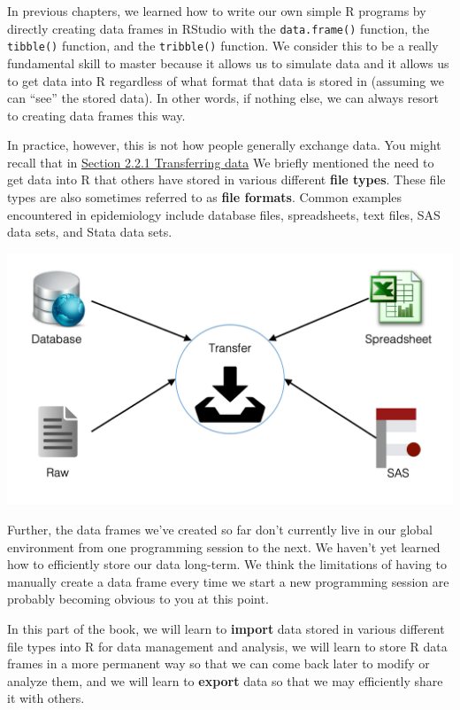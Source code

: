 \documentclass[
  letterpaper,
  DIV=11,
  numbers=noendperiod]{scrreprt}
\begin{document}
In previous chapters, we learned how to write our own simple R programs
by directly creating data frames in RStudio with the
\texttt{data.frame()} function, the \texttt{tibble()} function, and the
\texttt{tribble()} function. We consider this to be a really fundamental
skill to master because it allows us to simulate data and it allows us
to get data into R regardless of what format that data is stored in
(assuming we can ``see'' the stored data). In other words, if nothing
else, we can always resort to creating data frames this way.

In practice, however, this is not how people generally exchange data.
You might recall that in \hyperref[transferring-data]{Section 2.2.1
Transferring data} We briefly mentioned the need to get data into R that
others have stored in various different \textbf{file types}. These file
types are also sometimes referred to as \textbf{file formats}. Common
examples encountered in epidemiology include database files,
spreadsheets, text files, SAS data sets, and Stata data sets.

\includegraphics{chapters/data_transfer/competencies_transfer.png}

Further, the data frames we've created so far don't currently live in
our global environment from one programming session to the next. We
haven't yet learned how to efficiently store our data long-term. We
think the limitations of having to manually create a data frame every
time we start a new programming session are probably becoming obvious to
you at this point.

In this part of the book, we will learn to \textbf{import} data stored
in various different file types into R for data management and analysis,
we will learn to store R data frames in a more permanent way so that we
can come back later to modify or analyze them, and we will learn to
\textbf{export} data so that we may efficiently share it with others.
\end{document}
